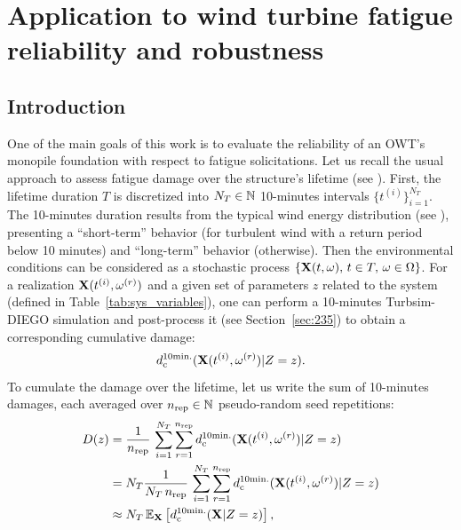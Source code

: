\cleardoublepage
\chapter{Application to wind turbine fatigue reliability and robustness}
\label{chpt:7}
\hfill
\localtableofcontents
\newpage

\section{Introduction}
One of the main goals of this work is to evaluate the reliability of an OWT's monopile foundation with respect to fatigue solicitations. 
Let us recall the usual approach to assess fatigue damage over the structure's lifetime (see \citealp[Appendix H]{iec_2019}). 
First, the lifetime duration $T$ is discretized into $N_T \in \mathbb{N}$ 10-minutes intervals $\{t^{(i)}\}_{i=1}^{N_T}$. 
The 10-minutes duration results from the typical wind energy distribution (see ), presenting a ``short-term'' behavior (for turbulent wind with a return period below 10 minutes) and ``long-term'' behavior (otherwise).
Then the environmental conditions can be considered as a stochastic process $\{{\bf X}(t, \omega), \, t \in T, \, \omega \in \Omega\}$.%
For a realization ${\bf X}(t^{(i)}, \omega^{(r)})$ and a given set of parameters $z$ related to the system (defined in Table~\ref{tab:sys_variables}), one can perform a 10-minutes Turbsim-DIEGO simulation and post-process it (see Section~\ref{sec:235}) to obtain a corresponding cumulative damage:
\begin{equation}
    d_{\mathrm{c}}^{10\mathrm{min.}}({\bf X}(t^{(i)}, \omega^{(r)})|Z=z). 
\end{equation}
To cumulate the damage over the lifetime, let us write the sum of 10-minutes damages, each averaged over $n_{\mathrm{rep}} \in \mathbb{N}$ pseudo-random seed repetitions: 
\begin{subequations}
    \begin{align}
        D(z) &= \frac{1}{n_{\mathrm{rep}}} \, \sum_{i=1}^{N_T} \sum_{r=1}^{n_{\mathrm{rep}}} d_{\mathrm{c}}^{10\mathrm{min.}}({\bf X}(t^{(i)}, \omega^{(r)})|Z=z)\\
             &= N_T \frac{1}{N_T \, n_{\mathrm{rep}}} \, \sum_{i=1}^{N_T} \sum_{r=1}^{n_{\mathrm{rep}}} d_{\mathrm{c}}^{10\mathrm{min.}}({\bf X}(t^{(i)}, \omega^{(r)})|Z=z)\\
             &\approx N_T \, \mathbb{E}_{{\bf X}}\left[d_{\mathrm{c}}^{10\mathrm{min.}}({\bf X}|Z=z)\right],
             \label{eq:expected_damage}
    \end{align}
\end{subequations}
